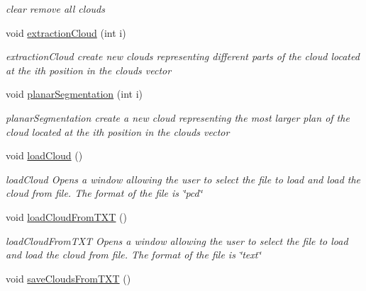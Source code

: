 \begin{DoxyCompactItemize}
\begin{DoxyCompactList}\small\item\em clear remove all clouds \end{DoxyCompactList}\item 
void \hyperlink{classView__pcl_abb07264cf45714a7531fa36a968a6a3c}{extraction\-Cloud} (int i)
\begin{DoxyCompactList}\small\item\em extraction\-Cloud create new clouds representing different parts of the cloud located at the ith position in the clouds vector \end{DoxyCompactList}\item 
void \hyperlink{classView__pcl_a6823105f34b5215f1c085b9c5233d216}{planar\-Segmentation} (int i)
\begin{DoxyCompactList}\small\item\em planar\-Segmentation create a new cloud representing the most larger plan of the cloud located at the ith position in the clouds vector \end{DoxyCompactList}\item 
\hypertarget{classView__pcl_a48b72b9d7b7616cfe25d028fe88fb641}{void \hyperlink{classView__pcl_a48b72b9d7b7616cfe25d028fe88fb641}{load\-Cloud} ()}\label{classView__pcl_a48b72b9d7b7616cfe25d028fe88fb641}

\begin{DoxyCompactList}\small\item\em load\-Cloud Opens a window allowing the user to select the file to load and load the cloud from file. The format of the file is \char`\"{}pcd\char`\"{} \end{DoxyCompactList}\item 
\hypertarget{classView__pcl_a684dfd64aca0283a5d286343db04f131}{void \hyperlink{classView__pcl_a684dfd64aca0283a5d286343db04f131}{load\-Cloud\-From\-T\-X\-T} ()}\label{classView__pcl_a684dfd64aca0283a5d286343db04f131}

\begin{DoxyCompactList}\small\item\em load\-Cloud\-From\-T\-X\-T Opens a window allowing the user to select the file to load and load the cloud from file. The format of the file is \char`\"{}text\char`\"{} \end{DoxyCompactList}\item 
\hypertarget{classView__pcl_a8ef1ed1a4c521243d43af150f0ded63b}{void \hyperlink{classView__pcl_a8ef1ed1a4c521243d43af150f0ded63b}{save\-Clouds\-From\-T\-X\-T} ()}\label{classView__pcl_a8ef1ed1a4c521243d43af150f0ded63b}


\end{DoxyCompactItemize}
